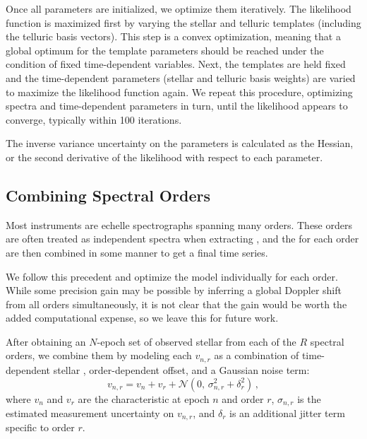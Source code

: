\documentclass[modern]{aastex62}
\begin{document}
Once all parameters are initialized, we optimize them iteratively.
The likelihood function is maximized first by varying the stellar and telluric templates (including the telluric basis vectors).
This step is a convex optimization, meaning that a global optimum for the template parameters should be reached under the condition of fixed time-dependent variables.
Next, the templates are held fixed and the time-dependent parameters (stellar \RVs and telluric basis weights) are varied to maximize the likelihood function again.
We repeat this procedure, optimizing spectra and time-dependent parameters in turn, until the likelihood appears to converge, typically within 100 iterations.

The inverse variance uncertainty on the parameters is calculated as the Hessian, or the second derivative of the likelihood with respect to each parameter. 

\subsection{Combining Spectral Orders}
\label{s:combining-orders}

Most \EPRV instruments are echelle spectrographs spanning many orders.
These orders are often treated as independent spectra when extracting \RVs, and the \RVs for each order are then combined in some manner to get a final time series.

We follow this precedent and optimize the \wobble model individually for each order.
While some \RV precision gain may be possible by inferring a global Doppler shift from all orders simultaneously, it is not clear that the gain would be worth the added computational expense, so we leave this for future work.

After obtaining an $N$-epoch set of observed stellar \RVs from each of the $R$ spectral orders, we combine them by modeling each \RV $v_{n,r}$ as a combination of time-dependent stellar \RV, order-dependent \RV offset, and a Gaussian noise term:
\begin{equation}
v_{n,r} = v_n + v_r + \mathcal{N}(0,\,\sigma_{n,r}^{2} + \delta_r^2 )\,,
\end{equation}
where $v_n$ and $v_r$ are the characteristic \RVs at epoch $n$ and order $r$, $\sigma_{n,r}$ is the estimated measurement uncertainty on $v_{n,r}$, and $\delta_r$ is an additional jitter term specific to order $r$.
\end{document}
